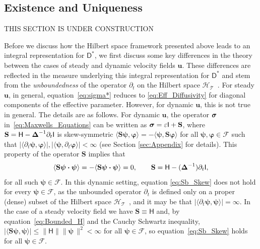\documentclass[leqno,onefignum,onetabnum]{siamltex1213}
\newcommand{\Sb}{\mathbf{S}}
\newcommand{\Tc}{\mathcal{T}}
\newcommand{\Hc}{\mathcal{H}}
\newcommand{\Fc}{\mathcal{F}}
\newcommand{\Dm}{\mathsf{D}}
\newcommand{\Hm}{\mathsf{H}}
\newcommand{\Ib}{\mathsf{I}}
\newcommand\bsig{\mbox{\boldmath${\sigma}$}}
\newcommand\bDelta{\mbox{\boldmath${\Delta}$}}
\providecommand\bcdot{\boldsymbol{\cdot}}
\newcommand{\vecu}{\boldsymbol{u}}
\newcommand{\vece}{\boldsymbol{e}}
\newcommand{\vecpsi}{\boldsymbol{\psi}}
\newcommand{\vecvarphi}{\boldsymbol{\varphi}}
\begin{document}
%
\subsection{Existence and Uniqueness}\label{sec:Existance!}
%
THIS SECTION IS UNDER CONSTRUCTION

Before we discuss how the Hilbert space framework presented above
leads to an  integral representation for $\Dm^*$, we first discuss
some key differences in the theory between the cases of steady 
and dynamic velocity fields $\vecu $. These differences are reflected
in the measure underlying this integral representation for $\Dm^*$
and stem from the \emph{unboundedness} of the operator $\partial_t$ on the
Hilbert space $\Hc_{\Tc}$~\cite{Reed-1980,Stone:64}. For steady
$\vecu $, in general, equation~\eqref{eq:sigma*} reduces to
\eqref{eq:Eff_Diffusivity} for  diagonal components of the effective
parameter.  However, for dynamic $\vecu $, this is not true in
general. The details are as follows. For dynamic $\vecu $, the
operator $\bsig$ in~\eqref{eq:Maxwells_Equations} can be written as
$\bsig=\varepsilon\Ib+\Sb$, where  $\Sb=\Hm-\bDelta^{-1}\partial_t\Ib$ is skew-symmetric 
$\langle\Sb\vecpsi,\vecvarphi\rangle=-\langle\vecpsi,\Sb\vecvarphi\rangle$ for all
$\vecpsi,\vecvarphi\in\Fc$ such that
$|\langle\partial_t\vecpsi,\vecvarphi\rangle|,|\langle\vecpsi,\partial_t\vecvarphi\rangle|<\infty$ (see Section
\ref{sec:Appendix} for details).  
This property of the operator $\Sb$ implies that
%
\begin{align}\label{eq:Sb_Skew_2}
  \langle\Sb\vecpsi\bcdot\vecpsi\rangle=-\langle\Sb\vecpsi\bcdot\vecpsi\rangle=0,
  \qquad
  \Sb=\Hm-(\bDelta^{-1})\partial_t\Ib,
\end{align}
%
for all such $\vecpsi\in\Fc$. In this dynamic setting, equation
\eqref{eq:Sb_Skew} does not hold for every $\vecpsi\in\Fc$, as the
unbounded operator $\partial_t$ is defined only on a proper (dense) subset of
the Hilbert space $\Hc_{\Tc}$~\cite{Reed-1980}, and it may be that
$|\langle\partial_t\vecpsi,\vecpsi\rangle|=\infty$. In the case of a steady velocity field
we have $\Sb\equiv\Hm$ and, by equation~\eqref{eq:Bounded_H} and the Cauchy
Schwartz inequality, $|\langle\Sb\vecpsi,\vecpsi\rangle|\leq\|\Hm\|\|\vecpsi\,\|^2<\infty$ for
all $\vecpsi\in\Fc$, so equation~\eqref{eq:Sb_Skew} holds for all
$\vecpsi\in\Fc$.   
\end{document}
